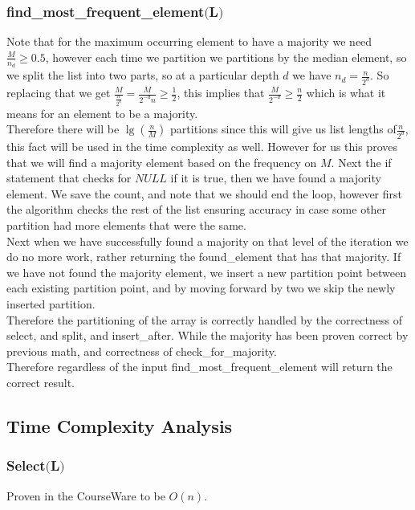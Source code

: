 \documentclass{article}
\begin{document}
       \subsubsection{find\_most\_frequent\_element$($L$)$}
       Note that for the maximum occurring element to have a majority we need $\frac{M}{n_{d}} \geq 0.5$, however each time we partition we partitions by the median element, so we split the list into two parts, so at a particular depth $d$ we have $n_{d} = \frac{n}{2^{d}}$.
       So replacing that we get $\frac{M}{\frac{n}{2^{d}}} = \frac{M}{2^{-d}n} \geq \frac{1}{2}$, this implies that $\frac{M}{2^{-d}} \geq \frac{n}{2}$ which is what it means for an element to be a majority. \\
       Therefore there will be $\lg(\frac{n}{M})$ partitions since this will give us list lengths of$\frac{n}{2^{d}}$, this fact will be used in the time complexity as well. However for us this proves that we will find a majority element based on the frequency on $M$.
       Next the if statement that checks for $NULL$ if it is true, then we have found a majority element. We save the count, and note that we should end the loop, however first the algorithm checks the rest of the list ensuring accuracy in case some other partition had more elements that were the same. \\
       Next when we have successfully found a majority on that level of the iteration we do no more work, rather returning the found\_element that has that majority.
       If we have not found the majority element, we insert a new partition point between each existing partition point, and by moving forward by two we skip the newly inserted partition. \\
       Therefore the partitioning of the array is correctly handled by the correctness of select, and split, and insert\_after. While the majority has been proven correct by previous math, and correctness of check\_for\_majority. \\
       Therefore regardless of the input find\_most\_frequent\_element will return the correct result.
    \subsection{Time Complexity Analysis}
      \subsubsection{Select$($L$)$}
        Proven in the CourseWare to be $O(n)$.
\end{document}

